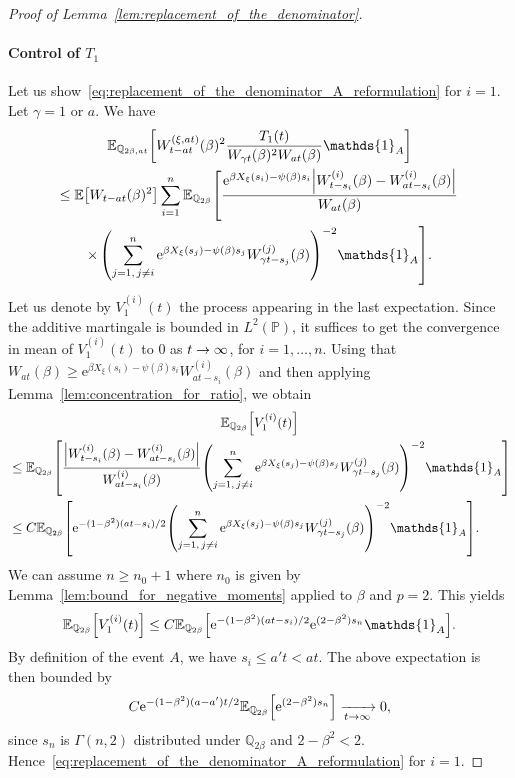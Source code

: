 \documentclass[10pt]{amsart}
\theoremstyle{definition}\newtheorem{defi}[theo]{Definition}\newtheorem{rema}[theo]{Remark}\newtheorem{exam}[theo]{Example}\newtheorem{exem}[theo]{Example}\newtheorem{nota}[theo]{Notation}
\newcommand{\e}{\mathrm{e}}
\newcommand{\E}{\mathbb{E}}
\renewcommand{\P}{\mathbb{P}}
\newcommand{\Q}{\mathbb{Q}}
\newcommand\1{\mathds{1}}
\let\originalleft\left
\let\originalright\right
\renewcommand{\left}{\mathopen{}\mathclose\bgroup\originalleft}
\renewcommand{\right}{\aftergroup\egroup\originalright}
\renewcommand*{\to}{\mathchoice{\longrightarrow}{\rightarrow}{\rightarrow}{\rightarrow}}
\begin{document}
\begin{proof}[Proof of Lemma~\ref{lem:replacement_of_the_denominator}]
\paragraph*{Control of $T_1$} Let us show~\eqref{eq:replacement_of_the_denominator_A_reformulation} for $i = 1$. Let $\gamma = 1 \text{ or } a$. We have
\begin{multline*}
\E_{\Q_{2\beta, at}} \left[W_{t - at}^{(\xi, at)}(\beta)^2 \frac{T_1(t)}{W_{\gamma t}(\beta)^2 W_{at}(\beta)} \1_A \right]  \\
\leq \E \left[W_{t - at}(\beta)^2 \right]
\sum_{i = 1}^n \E_{\Q_{2\beta}} \left[\frac{\e^{\beta X_\xi(s_i) - \psi(\beta)s_i} \left|W_{t - s_i}^{(i)}(\beta) - W_{at - s_i}^{(i)}(\beta)\right|}{W_{at}(\beta)}\right.\\
\times\left. \left(\sum_{j = 1,\, j \neq i}^n \e^{\beta X_\xi(s_j) - \psi(\beta)s_j} W_{\gamma t - s_j}^{(j)}(\beta) \right)^{-2} \1_A \right].
\end{multline*}
Let us denote by $V_1^{(i)}(t)$ the process appearing in the last expectation. Since the additive martingale is bounded in $L^2(\P)$, it suffices to get the convergence in mean of $V_1^{(i)}(t)$ to $0$ as $t \to \infty$, for $i = 1, \dots, n$. Using that $W_{at}(\beta) \geq \e^{\beta X_\xi(s_i) - \psi(\beta)s_i} W_{at - s_i}^{(i)}(\beta)$ and then applying Lemma~\ref{lem:concentration_for_ratio}, we obtain
\begin{multline*}
\E_{\Q_{2 \beta}} \left[V_1^{(i)}(t) \right]  \\
\begin{aligned}
& \leq \E_{\Q_{2 \beta}} \left[\frac{\left|W_{t - s_i}^{(i)}(\beta) - W_{at - s_i}^{(i)}(\beta)\right|}{W_{at - s_i}^{(i)}(\beta)} \left(\sum_{j = 1,\, j \neq i}^n \e^{\beta X_\xi(s_j) - \psi(\beta)s_j} W_{\gamma t - s_j}^{(j)}(\beta) \right)^{-2} \1_A \right]  \\
& \leq C \E_{\Q_{2 \beta}} \left[\e^{-(1-\beta^2)(at-s_i)/2} \left(\sum_{j = 1,\, j \neq i}^n \e^{\beta X_\xi(s_j) - \psi(\beta)s_j} W_{\gamma t - s_j}^{(j)}(\beta) \right)^{-2} \1_A \right]. 
\end{aligned}
\end{multline*}
We can assume $n \geq n_0+1$ where $n_0$ is given by Lemma~\ref{lem:bound_for_negative_moments} applied to $\beta$ and $p = 2$. This yields
\begin{equation*}
\E_{\Q_{2 \beta}} \left[V_1^{(i)}(t) \right] \leq C \E_{\Q_{2 \beta}} \left[\e^{-(1-\beta^2)(at-s_i)/2} \e^{(2 - \beta^2) s_n} \1_A \right].
\end{equation*}
By definition of the event $A$, we have $s_i \leq a't < at$. The above expectation is then bounded by
\begin{equation*}
C \e^{-(1-\beta^2)(a-a')t/2} \E_{\Q_{2 \beta}} \left[\e^{(2 - \beta^2) s_n} \right] \xrightarrow[t \to \infty]{} 0,
\end{equation*}
since $s_n$ is $\Gamma(n, 2)$ distributed under $\Q_{2\beta}$ and $2-\beta^2 < 2$. Hence~\eqref{eq:replacement_of_the_denominator_A_reformulation} for $i = 1$.


\end{proof}
\end{document}
